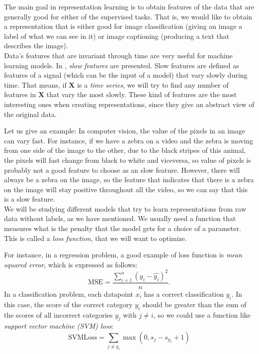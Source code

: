 The main goal in representation learning is to obtain features of the data that are generally good for either of the supervised tasks. That is, we would like to obtain
a representation that is either good for image classification (giving an image a label of what we can see in it) or image captioning (producing a text that describes the image).\\

Data's features that are invariant through time are very useful for machine learning models. In \citep{wiskott_slow_2002}, \emph{slow features} are presented. Slow features are defined as features of a signal 
(which can be the input of a model) that vary slowly during time. That means, if $\bm{X}$ is a \emph{time series}\footnotemark, we will try to find any number of features in $\bm{X}$ that vary the most slowly.
These kind of features are the most interesting ones when creating representations, since they give an abstract view of the original data.\\



Let us give an example: In computer vision, the value of the pixels in an image can vary fast. For instance, if we have a zebra on a video and the zebra is moving from one side of the image to the other, due 
to the black stripes of this animal, the pixels will fast change from black to white and viceversa, so value of pixels is probably not a good feature to choose as an slow feature. However, there will always
be a zebra on the image, so the feature that indicates that there is a zebra on the image will stay positive throughout all the video, so we can say that this is a slow feature.\\

We will be studying different models that try to learn representations from raw data without labels, as we have mentioned. We usually need a function that measures what is the penalty that the model gets for a choice of a parameter.
This is called a \emph{loss function}, that we will want to optimize.

For instance, in a regression problem, a good example of loss function is \emph{mean squared error}, which is expressed as follows:
\[
\text{MSE} = \frac{\sum_{i =1 }^n \left(y_i - \hat{y_i}\right)^2}{n}.
\]
In a classification problem, each datapoint $x_i$ has a correct classification $y_i$. In this case, the score of the correct category $y_i$ should be greater than the sum of the scores of all incorrect categories $y_j$ with $j \neq i$,
 so we could use a function like \emph{support vector machine (SVM) loss}:
\[
\text{SVMLoss} = \sum_{j \neq y_i} \max(0,s_j - s_{y_i} + 1)
\]


